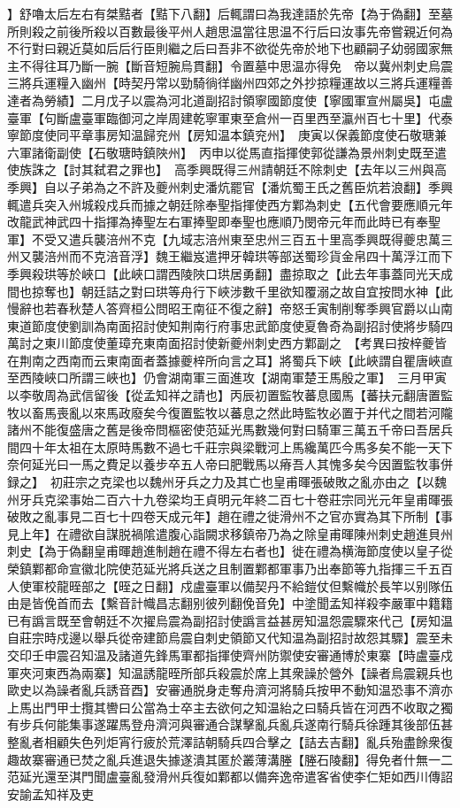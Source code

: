 】舒嚕太后左右有桀黠者【黠下八翻】后輒謂曰為我達語於先帝【為于偽翻】至墓所則殺之前後所殺以百數最後平州人趙思温當往思温不行后曰汝事先帝嘗親近何為不行對曰親近莫如后后行臣則繼之后曰吾非不欲從先帝於地下也顧嗣子幼弱國家無主不得往耳乃斷一腕【斷音短腕烏貫翻】令置墓中思温亦得免　帝以冀州刺史烏震三將兵運糧入幽州【時契丹常以勁騎徜徉幽州四郊之外抄掠糧運故以三將兵運糧善達者為勞績】二月戊子以震為河北道副招討領寧國節度使【寧國軍宣州屬吳】屯盧臺軍【句斷盧臺軍臨御河之岸周建乾寧軍東至倉州一百里西至瀛州百七十里】代泰寧節度使同平章事房知温歸兖州【房知温本鎮兖州】　庚寅以保義節度使石敬瑭兼六軍諸衛副使【石敬瑭時鎮陜州】　丙申以從馬直指揮使郭從謙為景州刺史既至遣使族誅之【討其弑君之罪也】　高季興既得三州請朝廷不除刺史【去年以三州與高季興】自以子弟為之不許及夔州刺史潘炕罷官【潘炕蜀王氏之舊臣炕若浪翻】季興輒遣兵突入州城殺戍兵而據之朝廷除奉聖指揮使西方鄴為刺史【五代會要應順元年改龍武神武四十指揮為捧聖左右軍捧聖即奉聖也應順乃閔帝元年而此時已有奉聖軍】不受又遣兵襲涪州不克【九域志涪州東至忠州三百五十里高季興既得夔忠萬三州又襲涪州而不克涪音浮】魏王繼岌遣押牙韓珙等部送蜀珍貨金帛四十萬浮江而下季興殺珙等於峽口【此峽口謂西陵陜口珙居勇翻】盡掠取之【此去年事蓋同光天成間也掠奪也】朝廷詰之對曰珙等舟行下峽涉數千里欲知覆溺之故自宜按問水神【此慢辭也若春秋楚人答齊桓公問昭王南征不復之辭】帝怒壬寅制削奪季興官爵以山南東道節度使劉訓為南面招討使知荆南行府事忠武節度使夏魯奇為副招討使將步騎四萬討之東川節度使董璋充東南面招討使新夔州刺史西方鄴副之　【考異曰按梓夔皆在荆南之西南而云東南面者蓋據夔梓所向言之耳】將蜀兵下峽【此峽謂自瞿唐峽直至西陵峽口所謂三峽也】仍會湖南軍三面進攻【湖南軍楚王馬殷之軍】　三月甲寅以李敬周為武信留後【從孟知祥之請也】丙辰初置監牧蕃息國馬【蕃扶元翻唐置監牧以畜馬喪亂以來馬政廢矣今復置監牧以蕃息之然此時監牧必置于并代之間若河隴諸州不能復盛唐之舊是後帝問樞密使范延光馬數幾何對曰騎軍三萬五千帝曰吾居兵間四十年太祖在太原時馬數不過七千莊宗與梁戰河上馬纔萬匹今馬多矣不能一天下奈何延光曰一馬之費足以養步卒五人帝曰肥戰馬以瘠吾人其愧多矣今因置監牧事併録之】　初莊宗之克梁也以魏州牙兵之力及其亡也皇甫暉張破敗之亂亦由之【以魏州牙兵克梁事始二百六十九卷梁均王貞明元年終二百七十卷莊宗同光元年皇甫暉張破敗之亂事見二百七十四卷天成元年】趙在禮之徙滑州不之官亦實為其下所制【事見上年】在禮欲自謀脱禍隂遣腹心詣闕求移鎮帝乃為之除皇甫暉陳州刺史趙進貝州刺史【為于偽翻皇甫暉趙進制趙在禮不得左右者也】徙在禮為横海節度使以皇子從榮鎮鄴都命宣徽北院使范延光將兵送之且制置鄴都軍事乃出奉節等九指揮三千五百人使軍校龍晊部之【晊之日翻】戍盧臺軍以備契丹不給鎧仗但繫幟於長竿以别隊伍由是皆俛首而去【繫音計幟昌志翻别彼列翻俛音免】中塗聞孟知祥殺李嚴軍中籍籍已有譌言既至會朝廷不次擢烏震為副招討使譌言益甚房知温怨震驟來代己【房知温自莊宗時戍邊以舉兵從帝建節烏震自刺史領節又代知温為副招討故怨其驟】震至未交印壬申震召知温及諸道先鋒馬軍都指揮使齊州防禦使安審通博於東寨【時盧臺戍軍夾河東西為兩寨】知温誘龍晊所部兵殺震於席上其衆譟於營外【譟者烏震親兵也歐史以為譟者亂兵誘音酉】安審通脱身走奪舟濟河將騎兵按甲不動知温恐事不濟亦上馬出門甲士攬其轡曰公當為士卒主去欲何之知温紿之曰騎兵皆在河西不收取之獨有步兵何能集事遂躍馬登舟濟河與審通合謀擊亂兵亂兵遂南行騎兵徐踵其後部伍甚整亂者相顧失色列炬宵行疲於荒澤詰朝騎兵四合擊之【詰去吉翻】亂兵殆盡餘衆復趣故寨審通已焚之亂兵進退失據遂潰其匿於叢薄溝塍【塍石陵翻】得免者什無一二范延光還至淇門聞盧臺亂發滑州兵復如鄴都以備奔逸帝遣客省使李仁矩如西川傳詔安諭孟知祥及吏

